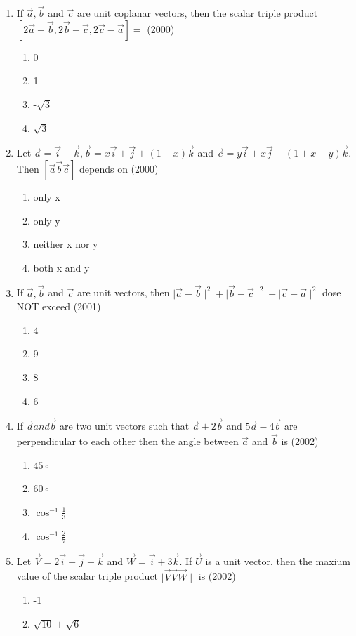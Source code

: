 \documentclass[12pt]{article}
\providecommand{\brak}[1]{\ensuremath{\left(#1\right)}}
\providecommand{\sbrak}[1]{\ensuremath{{}\left[#1\right]}}
\begin{document}
\begin{enumerate}
\item If $\vec{a},\vec{b}$ and $\vec{c}$ are unit coplanar vectors, then the scalar triple product $\sbrak{2\vec{a}-\vec{b},2\vec{b}-\vec{c},2\vec{c}-\vec{a}}=$  (2000)
\begin{enumerate}	
\item 0
\item 1
\item -$\sqrt{3}$
\item  $\sqrt{3}$
\end{enumerate}
\item Let $\vec{a}=\vec{i}-\vec{k},\vec{b}=x\vec{i}+\vec{j}+\brak{1-x}\vec{k}$ and $\vec{c}=y\vec{i}+x\vec{j}+\brak{1+x-y}\vec{k}$. Then $\sbrak{\vec{a}\vec{b}\vec{c}}$ depends on (2000)
\begin{enumerate}	
\item only x
\item only y
\item neither x nor y
\item both x and y
\end{enumerate}
\item If $\vec{a},\vec{b}$ and $\vec{c}$ are unit vectors, then $\mid \vec{a}-\vec{b}\mid^2 +\mid \vec{b}-\vec{c}\mid^2+\mid \vec{c}-\vec{a}\mid^2 $ dose NOT exceed (2001)
\begin{enumerate}	
\item 4
\item 9
\item 8 
\item 6
\end{enumerate}
\item If $\vec{a} and \vec{b}$ are two unit vectors such that $\vec{a}+2\vec{b}$ and $5\vec{a}-4\vec{b}$ are perpendicular to each other then the angle between $\vec{a}$ and $\vec{b}$ is (2002)
\begin{enumerate}	
\item $45\circ$
\item $60\circ$
\item $\cos^{-1}\frac{1}{3}$
\item $\cos^{-1}\frac{2}{7}$
\end{enumerate}
\item Let $\vec{V}=2\vec{i}+\vec{j}-\vec{k}$ and $\vec{W}=\vec{i}+3\vec{k}$. If $\vec{U}$ is a unit vector, then the maxium value of the scalar triple product $\mid\vec{V}\vec{V}\vec{W}\mid$ is (2002)
\begin{enumerate}	
\item -1
\item $\sqrt{10}+\sqrt{6}$

\end{enumerate}
\end{enumerate}
\end{document}

